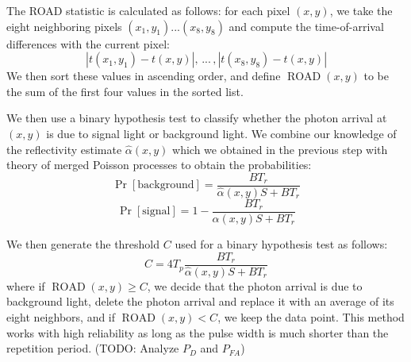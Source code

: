 The ROAD statistic is calculated as follows: for each pixel $(x,y)$, we take the eight neighboring pixels $(x_1,y_1) ... (x_8,y_8)$ and compute the time-of-arrival differences with the current pixel:
\begin{equation}
|t(x_1,y_1) - t(x,y)| , \, ... \, , |t(x_8,y_8) - t(x,y)|
\end{equation}
We then sort these values in ascending order, and define $\operatorname{ROAD}(x,y)$ to be the sum of the first four values in the sorted list.

We then use a binary hypothesis test to classify whether the photon arrival at $(x,y)$ is due to signal light or background light. We combine our knowledge of the reflectivity estimate $\hat{\alpha}(x,y)$ which we obtained in the previous step with theory of merged Poisson processes \cite{bertsekas-introduction} to obtain the probabilities:
\begin{equation}
\operatorname{Pr}[\mathrm{background}] = \frac{BT_r}{\hat{\alpha}(x,y)S + BT_r}
\end{equation}
\begin{equation}
\operatorname{Pr}[\mathrm{signal}] = 1 - \frac{BT_r}{\hat{\alpha}(x,y)S + BT_r}
\end{equation}

We then generate the threshold $C$ used for a binary hypothesis test as follows:
\begin{equation}
C = 4T_p \frac{ BT_r }{\hat{\alpha}(x,y)S + BT_r}
\end{equation}
where if $\operatorname{ROAD}(x,y) \geq C$, we decide that the photon arrival is due to background light, delete the photon arrival and replace it with an average of its eight neighbors, and if $\operatorname{ROAD}(x,y) < C$, we keep the data point. This method works with high reliability \cite{garnett-universal} as long as the pulse width is much shorter than the repetition period. (TODO: Analyze $P_D$ and $P_{FA}$)

